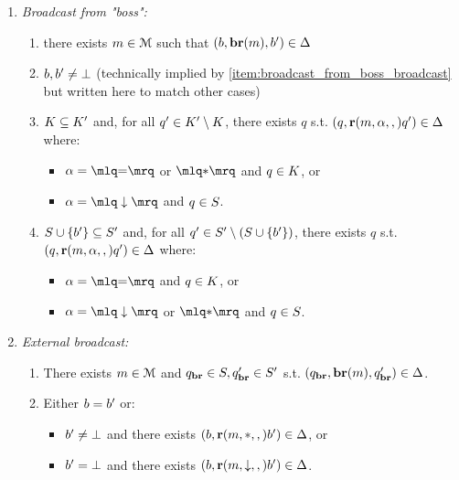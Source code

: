 \begin{definition}
\begin{enumerate}
	\item \emph{Broadcast from "boss":}
	\begin{enumerate}[i]
		\item \label{item:broadcast_from_boss_broadcast} there exists $m \in \mathcal{M}$ such that $(\boss, \brone{m}, \boss') \in \transitions$
		
		\item\label{item:broadcast_from_boss_boss} $\boss, \boss' \ne \noboss$ (technically implied by \ref{item:broadcast_from_boss_broadcast} but written here to match other cases)

		\item\label{item:broadcast_from_boss_clique} 	$\clique \subseteq \clique'$ and, for all $q' \in \clique' \setminus \clique$, there exists $q$ s.t. $(q, \textbf{r}(m, \alpha, ,) q') \in \Delta$ where:
		\begin{itemize}
			\item $\anact = \quotemarks{\eqtestact}$ or $\quotemarks{\dummyact}$ and $q \in \clique$, or
			\item $\anact= \quotemarks{\enregact}$ and $q \in S$.
		\end{itemize}
				
		\item\label{item:broadcast_from_boss_covset} $\covset \cup \set{\boss'} \subseteq \covset'$ and, for all $q' \in \covset' \setminus (\covset \cup \set{\boss'})$, there exists $q$ s.t. $(q, \textbf{r}(m, \alpha, ,) q') \in \Delta$ where:
		\begin{itemize}
			\item  $\anact = \quotemarks{\eqtestact}$ and $q \in \clique$, or
			\item $\anact = \quotemarks{\enregact}$ or $\quotemarks{\dummyact}$ and $q \in S$.
		\end{itemize}
	\end{enumerate}


	\item \emph{External broadcast:}
	\begin{enumerate}[i]
		\item\label{item:external_broadcast_broadcast} There exists $m \in \mathcal{M}$ and $q_{\textbf{br}} \in S, q_{\textbf{br}}' \in S'$ s.t. $(q_{\textbf{br}}, \textbf{br}(m), q_{\textbf{br}}') \in \Delta$. 
	
		\item\label{item:external_broadcast_boss}Either $\boss = \boss'$ or:
		\begin{itemize} 
			\item $\boss' \ne \noboss$ and there exists $(\boss, \rec{\amessage}{\dummyact}, \boss') \in \transitions$, or
			\item $\boss' = \noboss$ and there exists $(\boss, \rec{\amessage}{\enregact}, \boss') \in \transitions$.
		\end{itemize}


\end{enumerate}
\end{enumerate}
\end{definition}
